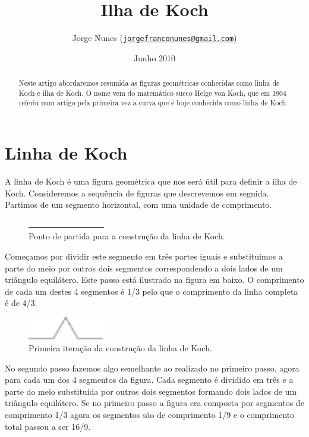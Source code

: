 \documentclass[11pt]{article}
\title{Ilha de Koch}
\author{Jorge Nunes ({\tt\href{mailto:jorgefranconunes@gmail.com}{jorgefranconunes@gmail.com}})}
\date{Junho 2010}
\begin{document}
\maketitle


\begin{abstract}
\noindent Neste artigo abordaremos resumida as figuras geométricas
conhecidas como linha de Koch e ilha de Koch. O nome vem do matemático
sueco Helge von Koch, que em 1904 referiu num artigo pela primeira vez
a curva que é hoje conhecida como linha de Koch.
\end{abstract}





\section{Linha de Koch}

A linha de Koch é uma figura geométrica que nos será útil para definir
a ilha de Koch. Consideremos a sequência de figuras que descrevemos em
seguida. Partimos de um segmento horizontal, com uma unidade de
comprimento.

\begin{figure}[H]
  \centering
  \includegraphics[width=0.3\textwidth]{../images/koch-line-00.pdf}
  \caption{Ponto de partida para a construção da linha de Koch.}
\end{figure}


Começamos por dividir este segmento em três partes iguais e
substituimos a parte do meio por outros dois segmentos correspondendo
a dois lados de um triângulo equilátero. Este passo está ilustrado na
figura em baixo. O comprimento de cada um destes 4 segmentos é 1/3
pelo que o comprimento da linha completa é de 4/3.

\begin{figure}[H]
  \centering
  \includegraphics[width=0.3\textwidth]{../images/koch-line-01.pdf}
  \caption{Primeira iteração da construção da linha de Koch.}
\end{figure}


No segundo passo fazemos algo semelhante ao realizado no primeiro
passo, agora para cada um dos 4 segmentos da figura. Cada segmento é
dividido em três e a parte do meio substituida por outros dois
segmentos formando dois lados de um triângulo equilátero. Se no
primeiro passo a figura era composta por segmentos de comprimento 1/3
agora os segmentos são de comprimento 1/9 e o comprimento total passou
a ser 16/9.
\end{document}
